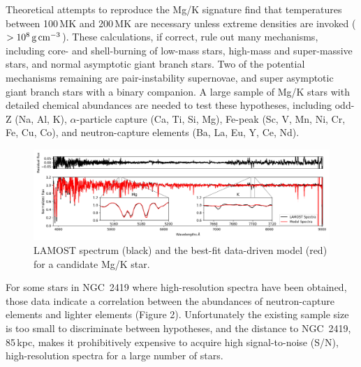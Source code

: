 \documentclass[12pt]{report}
\begin{document}
Theoretical attempts to reproduce the Mg/K signature find that temperatures between 100\,MK and 200\,MK are necessary unless extreme densities are invoked ($>10^8\,{\rm g\,cm}^{-3}$). These calculations, if correct, rule out many mechanisms, including core- and shell-burning of low-mass stars, high-mass and super-massive stars, and normal asymptotic giant branch stars. Two of the potential mechanisms remaining are pair-instability supernovae, and super asymptotic giant branch stars with a binary companion. A large sample of Mg/K stars with detailed chemical abundances are needed to test these hypotheses, including odd-Z (Na, Al, K), $\alpha$-particle capture (Ca, Ti, Si, Mg), Fe-peak (Sc, V, Mn, Ni, Cr, Fe, Cu, Co), and neutron-capture elements (Ba, La, Eu, Y, Ce, Nd).
\setcounter{figure}{0}
\begin{figure}[h!]
	\centering\vspace{-1em}
	\includegraphics[width=\textwidth]{figures/posterchild.png}
	\vspace{-1em}
\caption{\small LAMOST spectrum (black) and the best-fit data-driven model (red) for a candidate Mg/K star.}\vspace{-2em}
	\label{fig:spectra}\end{figure}


For some  stars in NGC~2419 where high-resolution spectra have been obtained, those data indicate a correlation between the abundances of neutron-capture elements and lighter  elements (Figure 2). Unfortunately the existing sample size is too small to discriminate between hypotheses, and the distance to NGC~2419, 85\,kpc, makes it prohibitively expensive to acquire high signal-to-noise (S/N), high-resolution spectra for a large number of stars.
\end{document}
